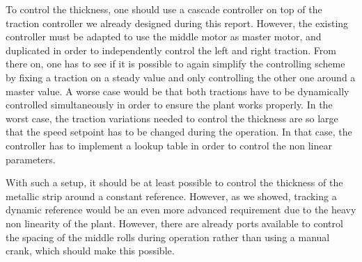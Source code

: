 To control the thickness, one should use a cascade controller on top of the traction controller we already designed during this report. However, the existing controller must be adapted to use the middle motor as master motor, and duplicated in order to independently control the left and right traction. From there on, one has to see if it is possible to again simplify the controlling scheme by fixing a traction on a steady value and only controlling the other one around a master value. A worse case would be that both tractions have to be dynamically controlled simultaneously in order to ensure the plant works properly. In the worst case, the traction variations needed to control the thickness are so large that the speed setpoint has to be changed during the operation. In that case, the controller has to implement a lookup table in order to control the non linear parameters.

With such a setup, it should be at least possible to control the thickness of the metallic strip around a constant reference. However, as we showed, tracking a dynamic reference would be an even more advanced requirement due to the heavy non linearity of the plant. However, there are already ports available to control the spacing of the middle rolls during operation rather than using a manual crank, which should make this possible.
